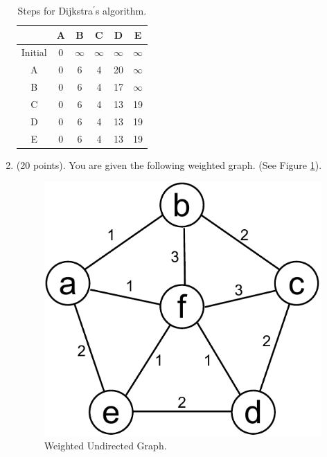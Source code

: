 \documentclass{article}
\begin{document}
\begin{enumerate}
\begin{table}[H]
  \begin{center}
    \begin{tabular}{|c|c|c|c|c|c|} 
      \hline & A & B & C & D & E \\
      \hline Initial & 0 &$\infty$&$\infty$&$\infty$&$\infty$ \\
      \hline A&0&6&4&20&$\infty$ \\
      \hline B&0&6&4&17&$\infty$ \\
      \hline C&0&6&4&13&19 \\
      \hline D&0&6&4&13&19 \\
      \hline E&0&6&4&13&19 \\
      \hline
    \end{tabular}
    \caption{Steps for Dijkstra$^{\prime}$s algorithm. \label{tbl:dij_alg}} 
    \vspace{-15pt}
  \end{center}
\end{table}

\item (20 points). You are given the following weighted
  graph. (See Figure \ref{fig:weighted_undirected}).\\

\begin{figure}[H]
  \vspace{-10pt}
  \begin{center}
    \includegraphics[scale=0.5]{weighted-graph}
    \caption{Weighted Undirected Graph. \label{fig:weighted_undirected}}
  \end{center}
  \vspace{-20pt}
\end{figure}


\end{enumerate}
\end{document}
